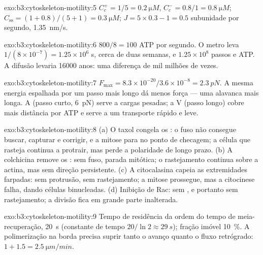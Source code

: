 \begin{solution}{exo:b3:cytoskeleton-motility:5}
$C_{c}^{+} = 1/5 = \qty{0.2}{\micro M}$, $C_{c}^{-} = 0.8/1 =
\qty{0.8}{\micro M}$; $C_{\text{ss}} = (1 + 0.8)/(5 + 1) = \qty{0.3}{\micro
M}$; $J = 5\times 0.3 - 1 = 0.5$ subunidade por segundo,
\qty{1.35}{nm/s}.
\end{solution}

\begin{solution}{exo:b3:cytoskeleton-motility:6}
$800/8 = 100$ ATP por segundo. O metro leva $1/(8\times 10^{-7}) =
1.25\times 10^{6}$ s, cerca de duas semanas, e $1.25\times 10^{8}$
passos e ATP. A difusão levaria \num{16000} anos: uma diferença de mil
milhões de vezes.
\end{solution}

\begin{solution}{exo:b3:cytoskeleton-motility:7}
$F_{\max} = 8.3\times 10^{-20}/3.6\times 10^{-8} = \qty{2.3}{pN}$. A
mesma energia espalhada por um passo mais longo dá menos força --- uma
alavanca mais longa. A  (passo curto, \qty{6}{pN}) serve a
cargas pesadas; a  V (passo longo) cobre mais distância por ATP
e serve a um transporte rápido e leve.
\end{solution}

\begin{solution}{exo:b3:cytoskeleton-motility:8}
(a) O taxol congela os : o fuso não consegue buscar,
capturar e corrigir, e a mitose para no ponto de checagem; a célula que
rasteja continua a protrair, mas perde a polaridade de longo prazo. (b)
A colchicina remove os : sem fuso, parada mitótica; o
rastejamento continua sobre a actina, mas sem direção persistente. (c)
A citocalasina capeia as extremidades farpadas: sem protrusão, sem
rastejamento; a mitose prossegue, mas a citocinese falha, dando células
binucleadas. (d) Inibição de Rac: sem , e portanto sem
rastejamento; a divisão fica em grande parte inalterada.
\end{solution}

\begin{solution}{exo:b3:cytoskeleton-motility:9}
Tempo de residência da ordem do tempo de meia-recuperação, \qty{20}{s}
(constante de tempo $20/\ln 2 \approx \qty{29}{s}$); fração imóvel
\qty{10}{\%}. A polimerização na borda precisa suprir tanto o avanço
quanto o fluxo retrógrado: $1 + 1.5 = \qty{2.5}{\micro m/min}$.
\end{solution}


